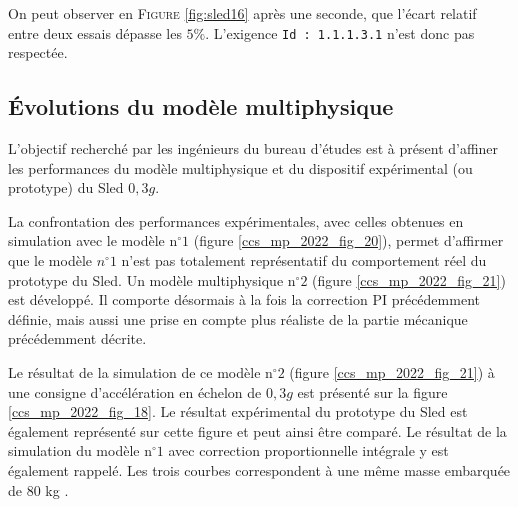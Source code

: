 \ifprof
\begin{corrige}
On peut observer en \textsc{Figure} \ref{fig:sled16} après une seconde, que l'écart relatif entre deux essais dépasse les $5\%$. L'exigence \texttt{Id : 1.1.1.3.1} n'est donc pas respectée.
\end{corrige}
\else
\fi

\subsection{Évolutions du modèle multiphysique \label{ccs_mp_2022_sec_4C}}
\begin{obj}
L'objectif recherché par les ingénieurs du bureau d'études est à présent d'affiner les performances du modèle multiphysique et du dispositif expérimental (ou prototype) du Sled $0,3 g$.
\end{obj}

\ifprof
\else

La confrontation des performances expérimentales, avec celles obtenues en simulation avec le modèle $\mathrm{n}^{\circ} 1$ (figure \ref{ccs_mp_2022_fig_20}), permet d'affirmer que le modèle $n^{\circ} 1$ n'est pas totalement représentatif du comportement réel du prototype du Sled. Un modèle multiphysique $\mathrm{n}^{\circ} 2$ (figure \ref{ccs_mp_2022_fig_21}) est développé. Il comporte désormais à la fois
la correction PI précédemment définie, mais aussi une prise en compte plus réaliste de la partie mécanique précédemment décrite.

Le résultat de la simulation de ce modèle $\mathrm{n}^{\circ} 2$ (figure \ref{ccs_mp_2022_fig_21}) à une consigne d'accélération en échelon de $0,3 g$ est présenté sur la figure \ref{ccs_mp_2022_fig_18}. Le résultat expérimental du prototype du Sled est également représenté sur cette figure et peut ainsi être comparé. Le résultat de la simulation du modèle $\mathrm{n}^{\circ} 1$ avec correction proportionnelle intégrale y est également rappelé. Les trois courbes correspondent à une même masse embarquée de 80 kg .


